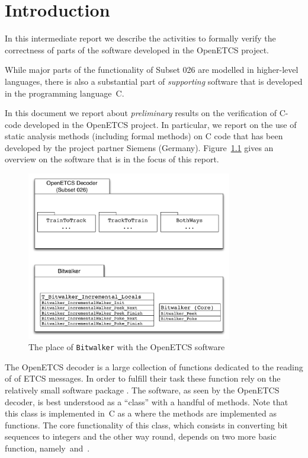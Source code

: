 
\chapter{Introduction}

In this intermediate report we describe the activities to formally verify
the correctness of parts of the software developed in the OpenETCS project.

While major parts of the functionality of {Subset 026} are modelled in 
higher-level languages, there is also a substantial part of \emph{supporting} software
that is developed in the programming language~C.

In this document we report about \emph{preliminary} results on the verification
of C-code developed in the OpenETCS project.
In particular, we report on the use of static analysis methods (including formal methods)
on C code that has been developed by the project partner Siemens (Germany).
Figure~\ref{fig:Bitwalker-Overview} gives an overview on the software that
is in the focus of this report.

\begin{figure}[hbt]
\begin{center}
\includegraphics[width=0.8\textwidth]{figures/Bitwalker-Overview.pdf}
\caption{\label{fig:Bitwalker-Overview} The place of \texttt{Bitwalker} with the OpenETCS software}
\end{center}
\end{figure}

The OpenETCS decoder is a large collection of functions dedicated to
the reading of of ETCS messages.
In order to fulfill their task these function rely on the relatively
small software package .
The  software, as seen by the OpenETCS decoder,
is best understood as a ``class'' with a handful of methods.
Note that this class is implemented in~C as a  where
the methods are implemented as functions.
The core functionality  of this class, which consists in converting bit sequences to integers
and the other way round, depends on two more basic function, namely~\peek and~\poke.

